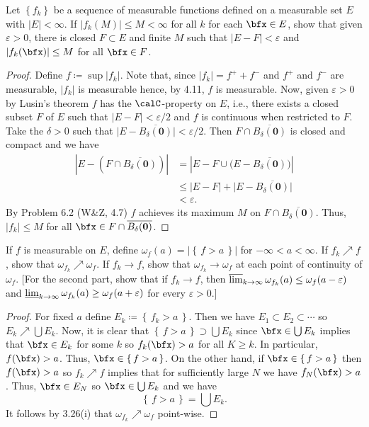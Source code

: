\begin{problem}
Let $\left\{f_k\right\}$ be a sequence of measurable functions defined on a
measurable set $E$ with $|E|<\infty$. If $|f_k(M)|\leq M<\infty$ for all
$k$ for each $\bfx\in E$, show that given $\varepsilon>0$, there is closed
$F\subset E$ and finite $M$ such that $|E\minus F|<\varepsilon$ and
$|f_k(\bfx)|\leq M$ for all $\bfx\in F$.
\end{problem}
\begin{proof}
Define $f\coloneqq\sup|f_k|$. Note that, since $|f_k|=f^++f^-$ and $f^+$
and $f^-$ are measurable, $|f_k|$ is measurable hence, by 4.11, $f$ is
measurable. Now, given $\varepsilon>0$ by Lusin's theorem $f$ has the
$\calC$-property on $E$, i.e., there exists a closed subset $F$ of $E$ such
that $|E\minus F|<\varepsilon/2$ and $f$ is continuous when restricted to
$F$. Take the $\delta>0$ such that
$\bigl|E\minus\overline{B_\delta(\mathbf{0})}\bigr|<\varepsilon/2$. Then
$F\cap\overline{B_\delta(\mathbf{0})}$ is closed and compact and we have
\begin{align*}
\left|E\minus(F\cap\overline{B_\delta(\mathbf{0})})\right|
&=\left|E\minus F\cup
  \bigl(E\minus\overline{B_\delta(\mathbf{0})}\bigr)\right|\\
&\leq|E\minus F|+\bigl|E\minus\overline{B_\delta(\mathbf{0})}\bigr|\\
&<\varepsilon.
\end{align*}
By Problem 6.2 (W\&Z, 4.7) $f$ achieves its maximum $M$ on
$F\cap\overline{B_\delta(\mathbf{0})}$. Thus, $|f_k|\leq M$ for all
$\bfx\in F\cap\overline{B_\delta(\mathbf{0})}$.
\end{proof}
\newpage

\begin{problem}
If $f$ is measurable on $E$, define
$\omega_f(a)=\left|\left\{\,f>a\,\right\}\right|$ for
$-\infty<a<\infty$. If $f_k\nearrow f$, show that
$\omega_{f_k}\nearrow\omega_f$. If $f_k\to f$, show that
$\omega_{f_k}\to\omega_f$ at each point of continuity of $\omega_f$. [For
the second part, show that if $f_k\to f$, then
$\varlimsup_{k\to\infty}\omega_{f_k}(a)\leq\omega_f(a-\varepsilon)$ and
$\varliminf_{k\to\infty}\omega_{f_k}(a)\geq\omega_f(a+\varepsilon)$ for every
$\varepsilon>0$.]
\end{problem}
\begin{proof}
For fixed $a$ define $E_k\coloneqq\left\{\,f_k>a\,\right\}$. Then we have
$E_1\subset E_2\subset\cdots$ so $E_k\nearrow\bigcup E_k$. Now, it is clear
that $\left\{\,f>a\,\right\}\supset\bigcup E_k$ since $\bfx\in\bigcup E_k$
implies that $\bfx\in E_k$ for some $k$ so $f_k(\bfx)>a$ for all $K\geq
k$. In particular, $f(\bfx)>a$. Thus, $\bfx\in\left\{\,f>a\,\right\}$. On the
other hand, if $\bfx\in\left\{\,f>a\,\right\}$ then $f(\bfx)>a$ so
$f_k\nearrow f$ implies that for sufficiently large $N$ we have
$f_N(\bfx)>a$. Thus, $\bfx\in E_N$ so $\bfx\in\bigcup E_k$ and we have
\begin{equation}
\label{eq:equality-of-f-a}
\left\{\,f>a\,\right\}=\bigcup E_k.
\end{equation}
It follows by 3.26(i) that $\omega_{f_k}\nearrow\omega_f$ point-wise.
\end{proof}
\newpage

